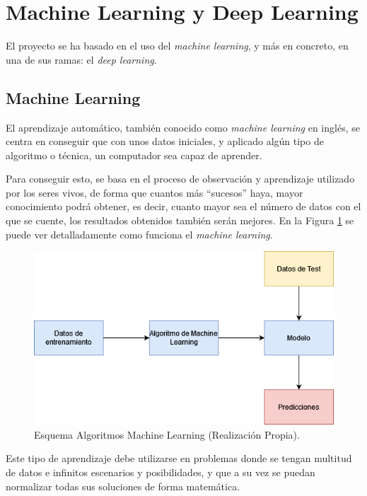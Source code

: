 
\section{Machine Learning y Deep Learning}
El proyecto se ha basado en el uso del \emph{machine learning}, y más en concreto, en una de sus ramas: el \emph{deep learning}.

\subsection{Machine Learning}
El aprendizaje automático, también conocido como \emph{machine learning} en inglés, se centra en conseguir que con unos datos iniciales, y aplicado algún tipo de algoritmo o técnica, un computador sea capaz de aprender.

Para conseguir esto, se basa en el proceso de observación y aprendizaje utilizado por los seres vivos, de forma que cuantos más \enquote{sucesos} haya, mayor conocimiento podrá obtener, es decir, cuanto mayor sea el número de datos con el que se cuente, los resultados obtenidos también serán mejores. En la Figura \ref{f:esquemaML} se puede ver detalladamente como funciona el \emph{machine learning}.

\begin{figure}[h]
    \centering
    \includegraphics[scale=0.7]{img/Esquema_ML.png}
    \caption{Esquema Algoritmos Machine Learning (Realización Propia).}
    \label{f:esquemaML}
\end{figure}

Este tipo de aprendizaje debe utilizarse en problemas donde se tengan multitud de datos e infinitos escenarios y posibilidades, y que a su vez se puedan normalizar todas sus soluciones de forma matemática.

